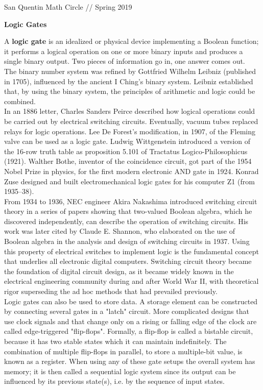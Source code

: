 \documentclass[11pt]{report}
\begin{document}
\normalsize {San Quentin Math Circle // Spring 2019}

\begin{center}
	\textbf{Logic Gates}
\end{center}

\quad A \textbf{logic gate} is an idealized or physical device implementing a Boolean function; it performs a logical operation on one or more binary inputs and produces a single binary output.  Two pieces of information go in, one answer comes out.\\
\vspace{2mm}
\quad The binary number system was refined by Gottfried Wilhelm Leibniz (published in 1705), influenced by the ancient I Ching's binary system. Leibniz established that, by using the binary system, the principles of arithmetic and logic could be combined.\\
\vspace{2mm}
\quad In an 1886 letter, Charles Sanders Peirce described how logical operations could be carried out by electrical switching circuits. Eventually, vacuum tubes replaced relays for logic operations. Lee De Forest's modification, in 1907, of the Fleming valve can be used as a logic gate. Ludwig Wittgenstein introduced a version of the 16-row truth table as proposition 5.101 of Tractatus Logico-Philosophicus (1921). Walther Bothe, inventor of the coincidence circuit, got part of the 1954 Nobel Prize in physics, for the first modern electronic AND gate in 1924. Konrad Zuse designed and built electromechanical logic gates for his computer Z1 (from 1935–38).\\
\vspace{2mm}
\quad From 1934 to 1936, NEC engineer Akira Nakashima introduced switching circuit theory in a series of papers showing that two-valued Boolean algebra, which he discovered independently, can describe the operation of switching circuits.  His work was later cited by Claude E. Shannon, who elaborated on the use of Boolean algebra in the analysis and design of switching circuits in 1937. Using this property of electrical switches to implement logic is the fundamental concept that underlies all electronic digital computers. Switching circuit theory became the foundation of digital circuit design, as it became widely known in the electrical engineering community during and after World War II, with theoretical rigor superseding the ad hoc methods that had prevailed previously.\\
\vspace{2mm}
\quad Logic gates can also be used to store data. A storage element can be constructed by connecting several gates in a "latch" circuit. More complicated designs that use clock signals and that change only on a rising or falling edge of the clock are called edge-triggered "flip-flops". Formally, a flip-flop is called a bistable circuit, because it has two stable states which it can maintain indefinitely. The combination of multiple flip-flops in parallel, to store a multiple-bit value, is known as a register. When using any of these gate setups the overall system has memory; it is then called a sequential logic system since its output can be influenced by its previous state(s), i.e. by the sequence of input states. \\
\end{document}

